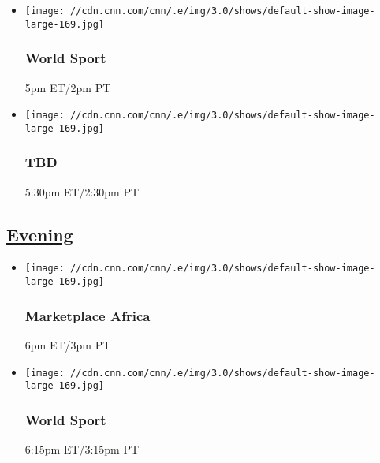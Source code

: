 \begin{itemize}
\item
  \texttt{[image: //cdn.cnn.com/cnn/.e/img/3.0/shows/default-show-image-large-169.jpg]}

  \hypertarget{world-sport-1}{%
  \subsubsection{World Sport}\label{world-sport-1}}

  5pm ET/2pm PT
\end{itemize}

\begin{itemize}
\item
  \texttt{[image: //cdn.cnn.com/cnn/.e/img/3.0/shows/default-show-image-large-169.jpg]}

  \hypertarget{tbd-1}{%
  \subsubsection{TBD}\label{tbd-1}}

  5:30pm ET/2:30pm PT
\end{itemize}

\hypertarget{evening-}{%
\subsection{\texorpdfstring{\href{/tv/schedule/cnn/index.html}{Evening}~}{Evening~}}\label{evening-}}

\begin{itemize}
\item
  \texttt{[image: //cdn.cnn.com/cnn/.e/img/3.0/shows/default-show-image-large-169.jpg]}

  \hypertarget{marketplace-africa-1}{%
  \subsubsection{Marketplace Africa}\label{marketplace-africa-1}}

  6pm ET/3pm PT
\end{itemize}

\begin{itemize}
\item
  \texttt{[image: //cdn.cnn.com/cnn/.e/img/3.0/shows/default-show-image-large-169.jpg]}

  \hypertarget{world-sport-2}{%
  \subsubsection{World Sport}\label{world-sport-2}}

  6:15pm ET/3:15pm PT
\end{itemize}

